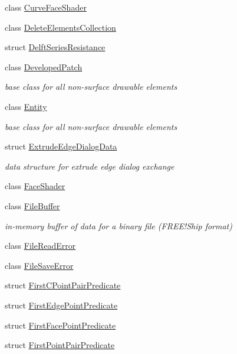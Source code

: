 \begin{DoxyCompactItemize}
class \hyperlink{classShipCAD_1_1CurveFaceShader}{Curve\+Face\+Shader}
\item 
class \hyperlink{classShipCAD_1_1DeleteElementsCollection}{Delete\+Elements\+Collection}
\item 
struct \hyperlink{structShipCAD_1_1DelftSeriesResistance}{Delft\+Series\+Resistance}
\item 
class \hyperlink{classShipCAD_1_1DevelopedPatch}{Developed\+Patch}
\begin{DoxyCompactList}\small\item\em base class for all non-\/surface drawable elements \end{DoxyCompactList}\item 
class \hyperlink{classShipCAD_1_1Entity}{Entity}
\begin{DoxyCompactList}\small\item\em base class for all non-\/surface drawable elements \end{DoxyCompactList}\item 
struct \hyperlink{structShipCAD_1_1ExtrudeEdgeDialogData}{Extrude\+Edge\+Dialog\+Data}
\begin{DoxyCompactList}\small\item\em data structure for extrude edge dialog exchange \end{DoxyCompactList}\item 
class \hyperlink{classShipCAD_1_1FaceShader}{Face\+Shader}
\item 
class \hyperlink{classShipCAD_1_1FileBuffer}{File\+Buffer}
\begin{DoxyCompactList}\small\item\em in-\/memory buffer of data for a binary file (F\+R\+E\+E!\+Ship format) \end{DoxyCompactList}\item 
class \hyperlink{classShipCAD_1_1FileReadError}{File\+Read\+Error}
\item 
class \hyperlink{classShipCAD_1_1FileSaveError}{File\+Save\+Error}
\item 
struct \hyperlink{structShipCAD_1_1FirstCPointPairPredicate}{First\+C\+Point\+Pair\+Predicate}
\item 
struct \hyperlink{structShipCAD_1_1FirstEdgePointPredicate}{First\+Edge\+Point\+Predicate}
\item 
struct \hyperlink{structShipCAD_1_1FirstFacePointPredicate}{First\+Face\+Point\+Predicate}
\item 
struct \hyperlink{structShipCAD_1_1FirstPointPairPredicate}{First\+Point\+Pair\+Predicate}

\end{DoxyCompactItemize}

